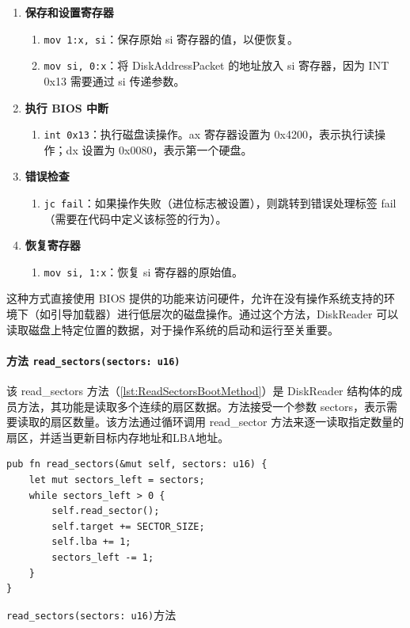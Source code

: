 \begin{enumerate}
    \item \textbf{保存和设置寄存器}
          \begin{enumerate}
              \item \texttt{mov {1:x}, si}：保存原始 si 寄存器的值，以便恢复。
              \item \texttt{mov si, {0:x}}：将 DiskAddressPacket 的地址放入 si 寄存器，因为 INT 0x13 需要通过 si 传递参数。
          \end{enumerate}
    \item \textbf{执行 BIOS 中断}
          \begin{enumerate}
              \item \texttt{int 0x13}：执行磁盘读操作。ax 寄存器设置为 0x4200，表示执行读操作；dx 设置为 0x0080，表示第一个硬盘。
          \end{enumerate}
    \item \textbf{错误检查}
          \begin{enumerate}
              \item \texttt{jc fail}：如果操作失败（进位标志被设置），则跳转到错误处理标签 fail（需要在代码中定义该标签的行为）。
          \end{enumerate}
    \item \textbf{恢复寄存器}
          \begin{enumerate}
              \item \texttt{mov si, {1:x}}：恢复 si 寄存器的原始值。
          \end{enumerate}
\end{enumerate}

这种方式直接使用 BIOS 提供的功能来访问硬件，允许在没有操作系统支持的环境下（如引导加载器）进行低层次的磁盘操作。通过这个方法，DiskReader 可以读取磁盘上特定位置的数据，对于操作系统的启动和运行至关重要。

\paragraph{方法 \texttt{read\_sectors(sectors: u16)}}

该 read\_sectors 方法（\cref{lst:ReadSectorsBootMethod}）是 DiskReader 结构体的成员方法，其功能是读取多个连续的扇区数据。方法接受一个参数 sectors，表示需要读取的扇区数量。该方法通过循环调用 read\_sector 方法来逐一读取指定数量的扇区，并适当更新目标内存地址和LBA地址。

\begin{listing}[htbp]
    \begin{verbatim}
pub fn read_sectors(&mut self, sectors: u16) {
    let mut sectors_left = sectors;
    while sectors_left > 0 {
        self.read_sector();
        self.target += SECTOR_SIZE;
        self.lba += 1;
        sectors_left -= 1;
    }
}
    \end{verbatim}
    \caption{\texttt{read\_sectors(sectors: u16)}方法}\label{lst:ReadSectorsBootMethod}
\end{listing}

